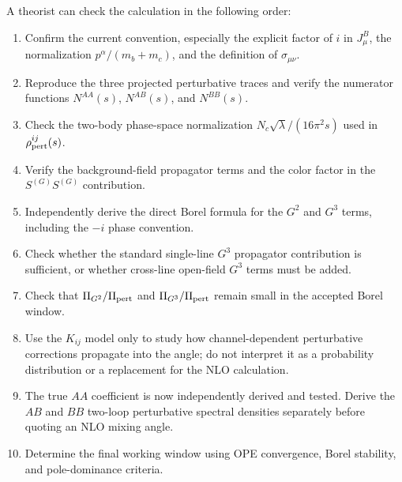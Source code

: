 \documentclass[11pt]{article}
\begin{document}
A theorist can check the calculation in the following order:
\begin{enumerate}
  \item Confirm the current convention, especially the explicit factor of
  $i$ in $J^B_\mu$, the normalization $p^\alpha/(m_b+m_c)$, and the
  definition of $\sigma_{\mu\nu}$.
  \item Reproduce the three projected perturbative traces and verify the
  numerator functions $N^{AA}(s)$, $N^{AB}(s)$, and $N^{BB}(s)$.
  \item Check the two-body phase-space normalization
  $N_c\sqrt{\lambda}/(16\pi^2s)$ used in $\rho_{\rm pert}^{ij}(s)$.
  \item Verify the background-field propagator terms and the color factor in
  the $S^{(G)}S^{(G)}$ contribution.
  \item Independently derive the direct Borel formula for the $G^2$ and $G^3$
  terms, including the $-i$ phase convention.
  \item Check whether the standard single-line $G^3$ propagator contribution
  is sufficient, or whether cross-line open-field $G^3$ terms must be added.
  \item Check that $\Pi_{G^2}/\Pi_{\rm pert}$ and
  $\Pi_{G^3}/\Pi_{\rm pert}$ remain small in the accepted Borel window.
  \item Use the $K_{ij}$ model only to study how channel-dependent
  perturbative corrections propagate into the angle; do not interpret it as
  a probability distribution or a replacement for the NLO calculation.
  \item The true \(AA\) coefficient is now independently derived and tested.
  Derive the \(AB\) and \(BB\) two-loop perturbative spectral densities
  separately before quoting an NLO mixing angle.
  \item Determine the final working window using OPE convergence, Borel
  stability, and pole-dominance criteria.
\end{enumerate}
\end{document}
